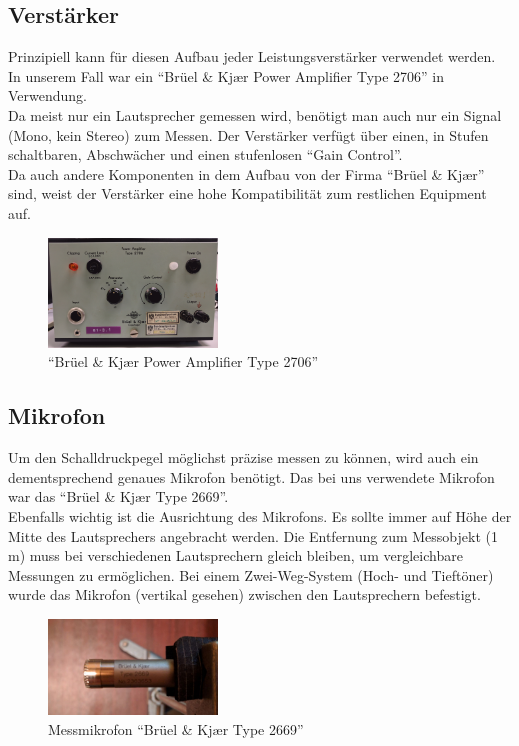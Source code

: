\newpage
\subsection*{Verstärker}\label{subsec:4.1.3}
Prinzipiell kann für diesen Aufbau jeder Leistungsverstärker verwendet werden.
In unserem Fall war ein \enquote{Brüel \& Kj\ae r Power Amplifier Type 2706} in Verwendung.
\\
Da meist nur ein Lautsprecher gemessen wird, benötigt man auch nur ein Signal (Mono, kein Stereo) zum Messen.
Der Verstärker verfügt über einen, in Stufen schaltbaren, Abschwächer und einen stufenlosen \enquote{Gain Control}.\\
Da auch andere Komponenten in dem Aufbau von der Firma  \enquote{Brüel \& Kj\ae r} sind, weist der Verstärker eine hohe Kompatibilität zum restlichen Equipment auf.
\begin{figure} [H]
	\centering
	\includegraphics[width=0.4\textwidth]{img/LSMessung/verstaerker1.png}
	\caption{\enquote{Brüel \& Kj\ae r Power Amplifier Type 2706}}
	\label{fig:4.1.3.1}
\end{figure}

\subsection*{Mikrofon}\label{subsec:4.1.4}
Um den Schalldruckpegel möglichst präzise messen zu können, wird auch ein dementsprechend genaues Mikrofon benötigt.
Das bei uns verwendete Mikrofon war das \enquote{Brüel \& Kj\ae r Type 2669}.
\\
Ebenfalls wichtig ist die Ausrichtung des Mikrofons.
Es sollte immer auf Höhe der Mitte des Lautsprechers angebracht werden.
Die Entfernung zum Messobjekt (1 m) muss bei verschiedenen Lautsprechern gleich bleiben, um vergleichbare Messungen zu ermöglichen.
Bei einem Zwei-Weg-System (Hoch- und Tieftöner) wurde das Mikrofon (vertikal gesehen) zwischen den Lautsprechern befestigt.
\begin{figure} [H]
	\centering
	\includegraphics[width=0.4\textwidth]{img/LSMessung/mikro.png}
	\caption{Messmikrofon \enquote{Brüel \& Kj\ae r Type 2669}}
	\label{fig:4.1.4.1}
\end{figure}